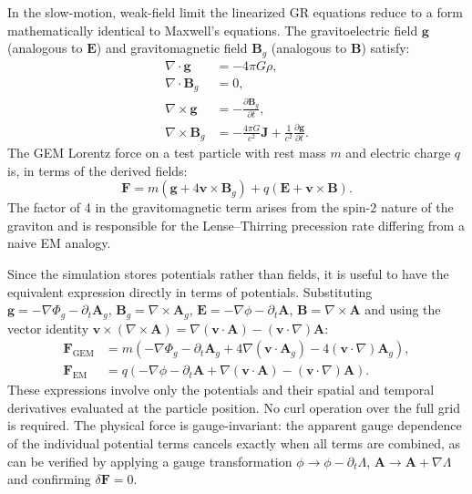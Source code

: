 \documentclass[11pt,a4paper]{article}
\newcommand{\vv}[1]{\mathbf{#1}}
\newcommand{\Phig}{\Phi_g}
\newcommand{\Ag}{\vv{A}_g}
\begin{document}
In the slow-motion, weak-field limit the linearized GR equations reduce to a form mathematically identical to Maxwell's equations.  The gravitoelectric field $\vv{g}$ (analogous to $\vv{E}$) and gravitomagnetic field $\vv{B}_g$ (analogous to $\vv{B}$) satisfy:
\begin{align}
  \nabla\cdot\vv{g}   &= -4\pi G\rho, \\
  \nabla\cdot\vv{B}_g &= 0, \\
  \nabla\times\vv{g}  &= -\frac{\partial\vv{B}_g}{\partial t}, \\
  \nabla\times\vv{B}_g &= -\frac{4\pi G}{c^2}\vv{J} + \frac{1}{c^2}\frac{\partial\vv{g}}{\partial t}.
\end{align}
The GEM Lorentz force on a test particle with rest mass $m$ and electric charge $q$ is, in terms of the derived fields:
\begin{equation}
  \vv{F} = m\!\left(\vv{g} + 4\vv{v}\times\vv{B}_g\right) + q\!\left(\vv{E} + \vv{v}\times\vv{B}\right).
\end{equation}
The factor of 4 in the gravitomagnetic term arises from the spin-2 nature of the graviton and is responsible for the Lense--Thirring precession rate differing from a naive EM analogy.

Since the simulation stores potentials rather than fields, it is useful to have the equivalent expression directly in terms of potentials.  Substituting $\vv{g} = -\nabla\Phig - \partial_t\Ag$, $\vv{B}_g = \nabla\times\Ag$, $\vv{E} = -\nabla\phi - \partial_t\vv{A}$, $\vv{B} = \nabla\times\vv{A}$ and using the vector identity $\vv{v}\times(\nabla\times\vv{A}) = \nabla(\vv{v}\cdot\vv{A}) - (\vv{v}\cdot\nabla)\vv{A}$:
\begin{align}
  \vv{F}_{\mathrm{GEM}} &= m\!\left(-\nabla\Phig - \partial_t\Ag
    + 4\nabla(\vv{v}\cdot\Ag) - 4(\vv{v}\cdot\nabla)\Ag\right), \label{eq:force_gem_pot} \\
  \vv{F}_{\mathrm{EM}}  &= q\!\left(-\nabla\phi - \partial_t\vv{A}
    + \nabla(\vv{v}\cdot\vv{A}) - (\vv{v}\cdot\nabla)\vv{A}\right). \label{eq:force_em_pot}
\end{align}
These expressions involve only the potentials and their spatial and temporal derivatives evaluated at the particle position.  No curl operation over the full grid is required.  The physical force is gauge-invariant: the apparent gauge dependence of the individual potential terms cancels exactly when all terms are combined, as can be verified by applying a gauge transformation $\phi\to\phi-\partial_t\Lambda$, $\vv{A}\to\vv{A}+\nabla\Lambda$ and confirming $\delta\vv{F}=0$.
\end{document}

